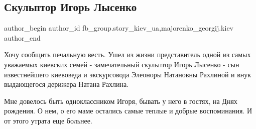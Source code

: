  
 
 
 
 
 
\subsection{Скульптор Игорь Лысенко}
\label{sec:23_07_2021.fb.fb_group.story_kiev_ua.2.skulptor_igor_lysenko}
 
\ifcmt
 author_begin
   author_id fb_group.story_kiev_ua,majorenko_georgij.kiev
 author_end
\fi

Хочу сообщить печальную весть. Ушел из жизни представитель одной из самых
уважаемых киевских семей - замечательный скульптор Игорь Лысенко - сын
известнейшего киевоведа и экскурсовода Элеоноры Натановны Рахлиной и внук
выдающегося дерижера Натана Рахлина.

\raggedcolumns
\begin{multicols}{3} %
\setlength{\parindent}{0pt}






\end{multicols} %

Мне довелось быть одноклассником Игоря, бывать у него в гостях, на Днях
рождения. О нем, о его маме остались самые теплые и добрые воспоминания. И от
этого утрата еще больнее.

